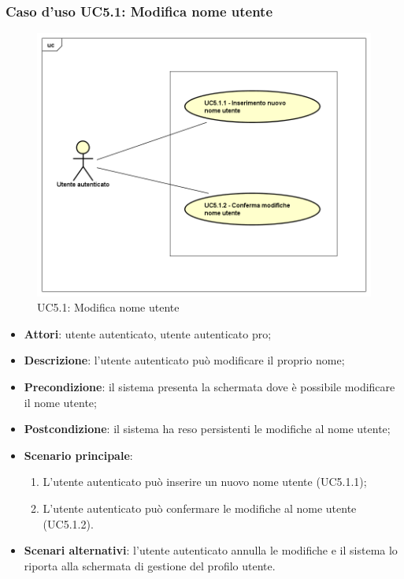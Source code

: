 \subsubsection{Caso d'uso UC5.1: Modifica nome utente}
\label{UC5.1}
\begin{figure}
	\centering
	\includegraphics[scale=0.5]{UML/UC5_1.png}
	\caption{UC5.1: Modifica nome utente}
\end{figure}
\begin{itemize}
	\item \textbf{Attori}: utente autenticato, utente autenticato pro;
	\item \textbf{Descrizione}: l'utente autenticato può modificare il proprio nome;
	\item \textbf{Precondizione}: il sistema presenta la schermata dove è possibile modificare il nome utente;
	\item \textbf{Postcondizione}: il sistema ha reso persistenti le modifiche al nome utente;
	\item \textbf{Scenario principale}:
		\begin{enumerate}
			\item L'utente autenticato può inserire un nuovo nome utente (UC5.1.1);
			\item L'utente autenticato può confermare le modifiche al nome utente (UC5.1.2).
		\end{enumerate}
	\item \textbf{Scenari alternativi}: l'utente autenticato annulla le modifiche e il sistema lo riporta alla schermata di gestione del profilo utente.
\end{itemize}

